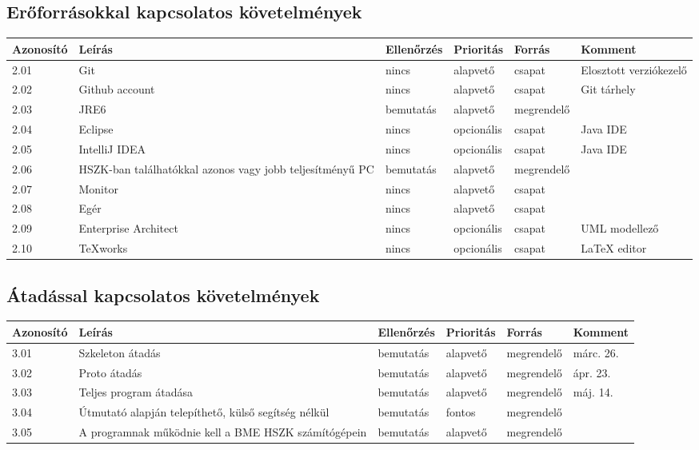 \subsection{Erőforrásokkal kapcsolatos követelmények}


\begin{longtable}{| l | p{5cm} | l | l | l | l |}
\hline
\textbf{Azonosító}   & \textbf{Leírás} & \textbf{Ellenőrzés} & \textbf{Prioritás} & \textbf{Forrás} & \textbf{Komment} \tabularnewline
\hline\hline
2.01 & Git & nincs  & alapvető & csapat & Elosztott verziókezelő \tabularnewline
\hline
2.02 & Github account & nincs  & alapvető & csapat & Git tárhely \tabularnewline
\hline
2.03 & JRE6 & bemutatás  & alapvető & megrendelő & \tabularnewline
\hline
2.04 & Eclipse & nincs & opcionális & csapat & Java IDE \tabularnewline
\hline
2.05 & IntelliJ IDEA & nincs & opcionális & csapat & Java IDE \tabularnewline
\hline
2.06 & HSZK-ban találhatókkal azonos vagy jobb teljesítményű PC & bemutatás & alapvető & megrendelő &  \tabularnewline
\hline
2.07 & Monitor & nincs & alapvető & csapat &  \tabularnewline
\hline
2.08 & Egér & nincs & alapvető & csapat &  \tabularnewline
\hline
2.09 & Enterprise Architect & nincs & opcionális & csapat & UML modellező \tabularnewline
\hline
2.10 & TeXworks & nincs & opcionális & csapat & LaTeX editor \tabularnewline
\hline
\end{longtable}


\subsection{Átadással kapcsolatos követelmények}

\begin{longtable}{| l | p{5cm} | l | l | l | l |}
\hline
\textbf{Azonosító}   & \textbf{Leírás} & \textbf{Ellenőrzés} & \textbf{Prioritás} & \textbf{Forrás} & \textbf{Komment} \tabularnewline
\hline\hline
3.01 & Szkeleton átadás & bemutatás & alapvető & megrendelő & márc. 26. \tabularnewline
\hline
3.02 & Proto átadás & bemutatás & alapvető & megrendelő & ápr. 23. \tabularnewline
\hline
3.03 & Teljes program átadása & bemutatás & alapvető & megrendelő & máj. 14. \tabularnewline
\hline
3.04 & Útmutató alapján telepíthető, külső segítség nélkül & bemutatás & fontos & megrendelő &  \tabularnewline
\hline
3.05 & A programnak működnie kell a BME HSZK számítógépein & bemutatás & alapvető & megrendelő &  \tabularnewline
\hline
\end{longtable}

